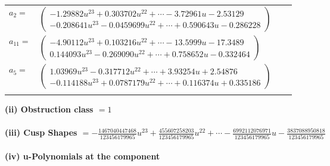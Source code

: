\documentclass[1p]{elsarticle_modified}
\theoremstyle{definition}
\begin{document}
\begin{tabular}{m{7pt} m{180pt} m{7pt} m{180pt} }
\flushright $a_{2}=$&$\begin{pmatrix}-1.29882 u^{23}+0.303702 u^{22}+\cdots-3.72961 u-2.53129\\-0.208641 u^{23}-0.0459699 u^{22}+\cdots+0.590643 u-0.286228\end{pmatrix}$ \\
\flushright $a_{11}=$&$\begin{pmatrix}-4.90112 u^{23}+0.103216 u^{22}+\cdots-13.5999 u-17.3489\\0.144093 u^{23}-0.269090 u^{22}+\cdots+0.758652 u-0.332464\end{pmatrix}$ \\
\flushright $a_{5}=$&$\begin{pmatrix}1.03969 u^{23}-0.317712 u^{22}+\cdots+3.93254 u+2.54876\\-0.114188 u^{23}+0.0787179 u^{22}+\cdots+0.116374 u+0.335186\end{pmatrix}$\\&\end{tabular}
\flushleft \textbf{(ii) Obstruction class $= 1$}\\~\\
\flushleft \textbf{(iii) Cusp Shapes $= -\frac{1467040447468}{123456179965} u^{23}+\frac{455607258203}{123456179965} u^{22}+\cdots-\frac{6992112076971}{123456179965} u-\frac{3837088950818}{123456179965}$}\\~\\
\newpage\renewcommand{\arraystretch}{1}
\flushleft \textbf{(iv) u-Polynomials at the component}\newline \\
\end{document}

